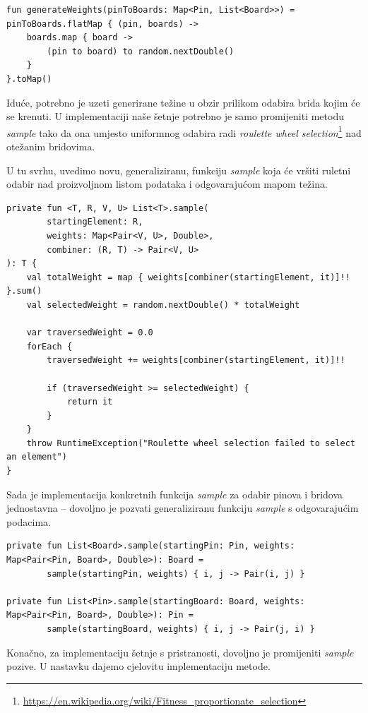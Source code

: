 \documentclass[times, utf8, seminar]{fer}
\begin{document}
\begin{lstlisting}
fun generateWeights(pinToBoards: Map<Pin, List<Board>>) = pinToBoards.flatMap { (pin, boards) ->
    boards.map { board ->
        (pin to board) to random.nextDouble()
    }
}.toMap()
\end{lstlisting}

Iduće, potrebno je uzeti generirane težine u obzir prilikom odabira brida kojim će se krenuti. U implementaciji naše šetnje potrebno je samo promijeniti metodu \textit{sample} tako da ona umjesto uniformnog odabira radi \textit{roulette wheel selection}\footnote{\url{https://en.wikipedia.org/wiki/Fitness_proportionate_selection}} nad otežanim bridovima.

U tu svrhu, uvedimo novu, generaliziranu, funkciju \textit{sample} koja će vršiti ruletni odabir nad proizvoljnom listom podataka i odgovarajućom mapom težina.

\begin{lstlisting}
private fun <T, R, V, U> List<T>.sample(
        startingElement: R,
        weights: Map<Pair<V, U>, Double>,
        combiner: (R, T) -> Pair<V, U>
): T {
    val totalWeight = map { weights[combiner(startingElement, it)]!! }.sum()
    val selectedWeight = random.nextDouble() * totalWeight

    var traversedWeight = 0.0
    forEach {
        traversedWeight += weights[combiner(startingElement, it)]!!

        if (traversedWeight >= selectedWeight) {
            return it
        }
    }
    throw RuntimeException("Roulette wheel selection failed to select an element")
}
\end{lstlisting}

Sada je implementacija konkretnih funkcija \textit{sample} za odabir pinova i bridova jednostavna -- dovoljno je pozvati generaliziranu funkciju \textit{sample} s odgovarajućim podacima.

\begin{lstlisting}
private fun List<Board>.sample(startingPin: Pin, weights: Map<Pair<Pin, Board>, Double>): Board =
        sample(startingPin, weights) { i, j -> Pair(i, j) }

private fun List<Pin>.sample(startingBoard: Board, weights: Map<Pair<Pin, Board>, Double>): Pin =
        sample(startingBoard, weights) { i, j -> Pair(j, i) }
\end{lstlisting}

Konačno, za implementaciju šetnje s pristranosti, dovoljno je promijeniti \textit{sample} pozive. U nastavku dajemo cjelovitu implementaciju metode.
\end{document}
